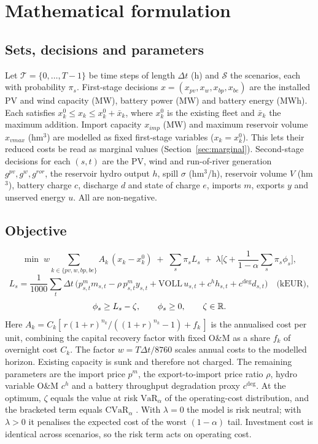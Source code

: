 \section{Mathematical formulation}
\label{sec:formulation}

\subsection{Sets, decisions and parameters}
Let $\mathcal{T}=\{0,\dots,T-1\}$ be time steps of length $\Delta t$ (h) and $\mathcal{S}$ the scenarios, each with
probability $\pi_s$. First-stage decisions $x=(x_{pv},x_{w},x_{bp},x_{be})$ are the installed PV and wind
capacity (MW), battery power (MW) and battery energy (MWh). Each satisfies
$x_k^0\le x_k\le x_k^0+\bar x_k$, where $x_k^0$ is the existing fleet and $\bar x_k$ the maximum addition. Import
capacity $x_{imp}$ (MW) and maximum reservoir volume $x_{vmax}$ (hm$^3$) are modelled as fixed first-stage
variables ($x_k=x_k^0$). This lets their reduced costs be read as marginal values (Section~\ref{sec:marginal}).
Second-stage decisions for each $(s,t)$ are the PV, wind and run-of-river generation $g^{pv},g^{w},g^{ror}$, the
reservoir hydro output $h$, spill $\sigma$ (hm$^3$/h), reservoir volume $V$ (hm$^3$), battery charge $c$,
discharge $d$ and state of charge $e$, imports $m$, exports $y$ and unserved energy $u$. All are non-negative.

\subsection{Objective}
\begin{equation}
\min\; w\sum_{k\in\{pv,w,bp,be\}} A_k\,(x_k-x_k^0)\;+\;\sum_{s}\pi_s L_s\;+\;\lambda\Big[\zeta+\frac{1}{1-\alpha}\sum_s\pi_s\phi_s\Big],
\label{eq:obj}
\end{equation}
\begin{equation}
L_s=\frac{1}{1000}\sum_{t}\Delta t\,\Big(p^m_{s,t}m_{s,t}-\rho\,p^m_{s,t}y_{s,t}+\mathrm{VOLL}\,u_{s,t}+c^h h_{s,t}+c^{\deg}d_{s,t}\Big)\quad\text{(kEUR)},
\label{eq:opex}
\end{equation}
\begin{equation}
\phi_s\ge L_s-\zeta,\qquad \phi_s\ge0,\qquad \zeta\in\mathbb{R} .
\label{eq:cvar}
\end{equation}
Here $A_k=C_k[\,r(1+r)^{n_k}/((1+r)^{n_k}-1)+f_k\,]$ is the annualised cost per unit, combining the capital
recovery factor with fixed O\&M as a share $f_k$ of overnight cost $C_k$. The factor $w=T\Delta t/8760$ scales
annual costs to the modelled horizon. Existing capacity is sunk and therefore not charged. The remaining
parameters are the import price $p^m$, the export-to-import price ratio $\rho$, hydro variable O\&M $c^h$ and a
battery throughput degradation proxy $c^{\deg}$. At the optimum, $\zeta$ equals the value at risk $\mathrm{VaR}_\alpha$
of the operating-cost distribution, and the bracketed term equals $\mathrm{CVaR}_\alpha$
\cite{rockafellar2000cvar,rockafellar2002cvar}. With $\lambda=0$ the model is risk neutral; with $\lambda>0$ it
penalises the expected cost of the worst $(1-\alpha)$ tail. Investment cost is identical across scenarios, so
the risk term acts on operating cost.

